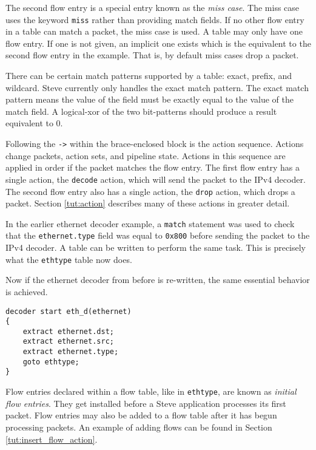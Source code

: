 The second flow entry is a special entry known as the \textit{miss case}. The miss case uses the keyword \texttt{miss} rather than providing match fields. If no other flow entry in a table can match a packet, the miss case is used. A table may only have one flow entry. If one is not given, an implicit one exists which is the equivalent to the second flow entry in the example. That is, by default miss cases drop a packet.

There can be certain match patterns supported by a table: exact, prefix, and wildcard. Steve currently only handles the exact match pattern. The exact match pattern means the value of the field must be exactly equal to the value of the match field. A logical-xor of the two bit-patterns should produce a result equivalent to 0.

Following the \texttt{->} within the brace-enclosed block is
the action sequence. Actions change packets, action sets, and pipeline state.
Actions in this sequence are applied in
order if the packet matches the flow entry. The first flow entry has a single action, the \texttt{decode} action, which
will send the packet to the IPv4 decoder. The second flow entry also has a single action, the \texttt{drop} action, which drops a packet. Section \ref{tut:action}
describes many of these actions in greater detail.

In the earlier ethernet decoder example, a \texttt{match} statement was used to check that the \texttt{ethernet.type} field was equal to \texttt{0x800} before sending the packet to the IPv4 decoder. A table can be written to perform the same task. This is precisely what the \texttt{ethtype} table now does.

Now if the ethernet decoder from before is re-written, the same essential behavior is achieved.

\begin{codepage}
\begin{lstlisting}
decoder start eth_d(ethernet)
{
	extract ethernet.dst;
	extract ethernet.src;
	extract ethernet.type;
	goto ethtype;
}
\end{lstlisting}
\end{codepage}

Flow entries declared within a flow table, like in \texttt{ethtype}, are known
as \textit{initial flow entries}. They get installed before a Steve application
processes its first packet. Flow entries may also be added to a flow table after it has begun processing packets. An
example of adding flows can be found in Section \ref{tut:insert_flow_action}.

